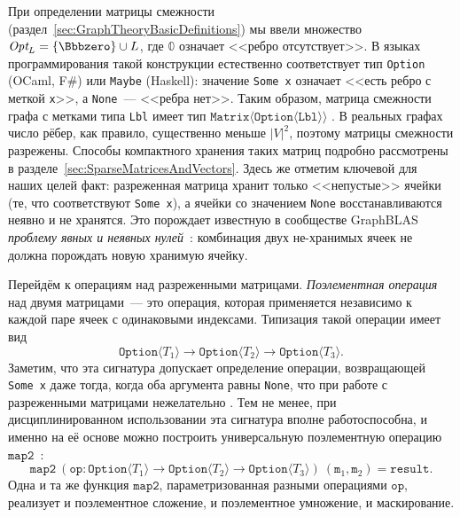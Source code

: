 При определении матрицы смежности (раздел~\ref{sec:GraphTheoryBasicDefinitions}) мы ввели множество $\Opt{L} = \{\Bbbzero\} \cup L$, где $\Bbbzero$ означает <<ребро отсутствует>>.
В языках программирования такой конструкции естественно соответствует тип \texttt{Option} (OCaml, F\#) или \texttt{Maybe} (Haskell): значение \texttt{Some x} означает <<есть ребро с меткой \texttt{x}>>, а \texttt{None}~--- <<ребра нет>>.
Таким образом, матрица смежности графа с метками типа \texttt{Lbl} имеет тип $\texttt{Matrix}\langle\texttt{Option}\langle\texttt{Lbl}\rangle\rangle$
.
В реальных графах число рёбер, как правило, существенно меньше $|V|^2$, поэтому матрицы смежности разрежены.
Способы компактного хранения таких матриц подробно рассмотрены в разделе~\ref{sec:SparseMatricesAndVectors}.
Здесь же отметим ключевой для наших целей факт: разреженная матрица хранит только <<непустые>> ячейки (те, что соответствуют \texttt{Some x}), а ячейки со значением \texttt{None} восстанавливаются неявно и не хранятся.
Это порождает известную в сообществе GraphBLAS \emph{проблему явных и неявных нулей}~: комбинация двух не-хранимых ячеек не должна порождать новую хранимую ячейку.

Перейдём к операциям над разреженными матрицами.
\emph{Поэлементная операция} над двумя матрицами~--- это операция, которая применяется независимо к каждой паре ячеек с одинаковыми индексами.
Типизация такой операции имеет вид
\[
    \texttt{Option}\langle T_1\rangle \to \texttt{Option}\langle T_2\rangle \to \texttt{Option}\langle T_3\rangle.
\]
Заметим, что эта сигнатура допускает определение операции, возвращающей \texttt{Some x} даже тогда, когда оба аргумента равны \texttt{None}, что при работе с разреженными матрицами нежелательно%
.
Тем не менее, при дисциплинированном использовании эта сигнатура вполне работоспособна, и именно на её основе можно построить универсальную поэлементную операцию $\texttt{map2}$~:
\[
    \texttt{map2}\ (\texttt{op}: \texttt{Option}\langle T_1\rangle \to \texttt{Option}\langle T_2\rangle \to \texttt{Option}\langle T_3\rangle)\ (\texttt{m}_1, \texttt{m}_2) = \texttt{result}.
\]
Одна и та же функция $\texttt{map2}$, параметризованная разными операциями $\texttt{op}$, реализует и поэлементное сложение, и поэлементное умножение, и маскирование.


